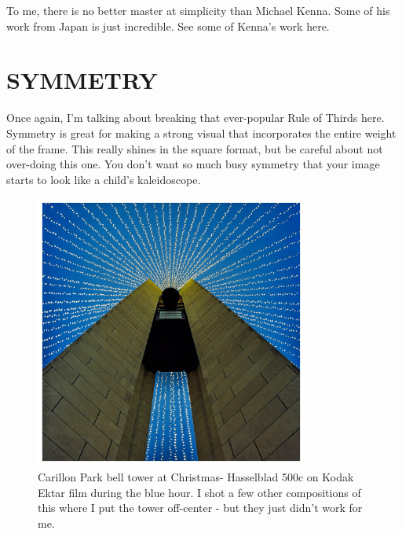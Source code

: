\documentclass[a4paper]{article}
\begin{document}
To me, there is no better master at simplicity than Michael Kenna. Some of his work from Japan is just incredible.  See some of Kenna’s work here.

\section*{SYMMETRY} 
Once again, I’m talking about breaking that ever-popular Rule of Thirds here. Symmetry is great for making a strong visual that incorporates the entire weight of the frame. This really shines in the square format, but be careful about not over-doing this one. You don’t want so much busy symmetry that your image starts to look like a child’s kaleidoscope.  

\begin{figure}[ht!]
    \centering
    \includegraphics[width=90mm]{img/49224084658_765dbc83a6_k.jpeg}
    \caption{Carillon Park bell tower at Christmas- Hasselblad 500c on Kodak Ektar film during the blue hour. I shot a few other compositions of this where I put the tower off-center - but they just didn’t work for me.}
\end{figure}
\end{document}
